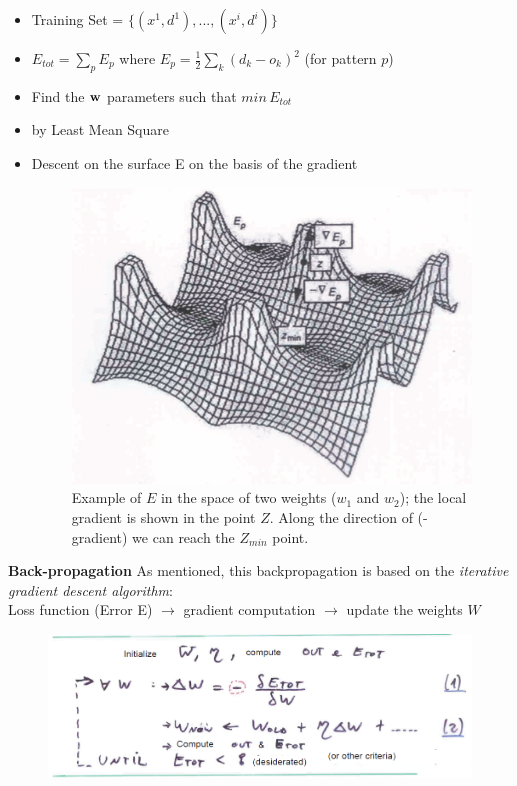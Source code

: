 \documentclass[../main.tex]{subfiles}
\begin{document}
\begin{itemize}
    \item Training Set = $\{(x^1,d^1),...,(x^i,d^i) \}$
    \item $E_{tot} =\sum_{p}E_p$ where $E_p = \frac{1}{2}\sum_{k} (d_k-o_k)^2$ (for pattern $p$)
    \item Find the $\bold{w}$ parameters such that $min \, E_{tot}$
    \item by Least Mean Square
    \item Descent on the surface E on the basis of the gradient
    \begin{figure}[H]
        \centering
        \includegraphics[scale = 0.4]{lectures/4_neural_networks/4_bpalgo_gradient.png}
        \caption{ Example of $E$ in the space of two weights ($w_1$ and $w_2$); the local gradient is shown in the point $Z$. Along the direction of (-gradient) we can reach the $Z_{min}$ point.}
        \label{fig:4_bpalgo_gradient}
    \end{figure}
\end{itemize}
\textbf{Back-propagation}
As mentioned, this backpropagation is based on the \emph{iterative gradient descent algorithm}:\\
Loss function (Error E) $\rightarrow$ gradient computation $\rightarrow$ update the weights $W$
\begin{figure}[H]
    \centering
    \includegraphics[scale = 0.5]{lectures/4_neural_networks/4_gradient_alg.png}
    \label{fig:4_gradient_alg_backpro}
\end{figure}
\end{document}
